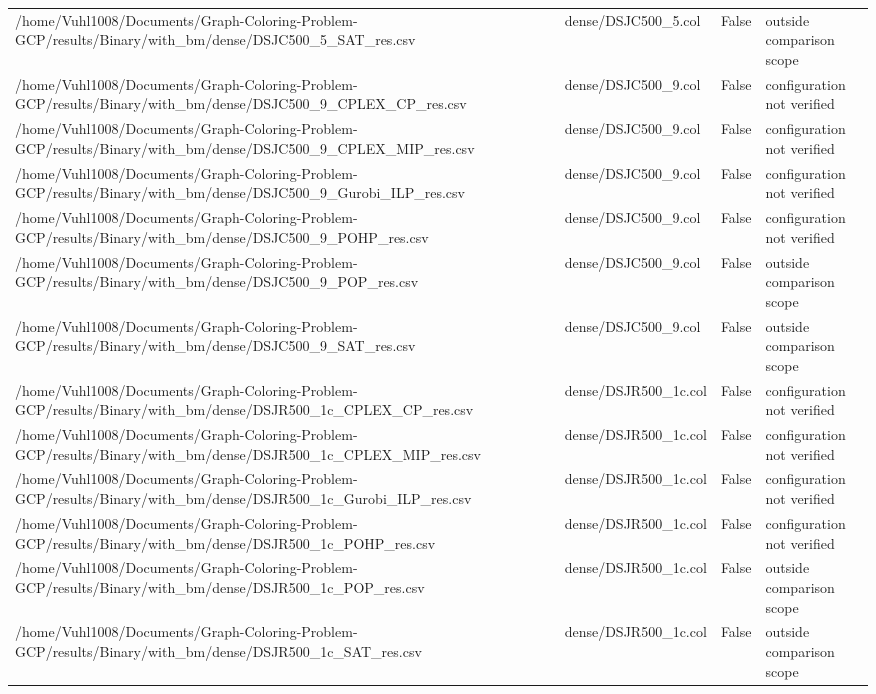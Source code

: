 \begin{table}[htbp]
\begin{tabular}{llll}
/home/Vuhl1008/Documents/Graph-Coloring-Problem-GCP/results/Binary/with\_bm/dense/DSJC500\_5\_SAT\_res.csv & dense/DSJC500\_5.col & False & outside comparison scope \\
/home/Vuhl1008/Documents/Graph-Coloring-Problem-GCP/results/Binary/with\_bm/dense/DSJC500\_9\_CPLEX\_CP\_res.csv & dense/DSJC500\_9.col & False & configuration not verified \\
/home/Vuhl1008/Documents/Graph-Coloring-Problem-GCP/results/Binary/with\_bm/dense/DSJC500\_9\_CPLEX\_MIP\_res.csv & dense/DSJC500\_9.col & False & configuration not verified \\
/home/Vuhl1008/Documents/Graph-Coloring-Problem-GCP/results/Binary/with\_bm/dense/DSJC500\_9\_Gurobi\_ILP\_res.csv & dense/DSJC500\_9.col & False & configuration not verified \\
/home/Vuhl1008/Documents/Graph-Coloring-Problem-GCP/results/Binary/with\_bm/dense/DSJC500\_9\_POHP\_res.csv & dense/DSJC500\_9.col & False & configuration not verified \\
/home/Vuhl1008/Documents/Graph-Coloring-Problem-GCP/results/Binary/with\_bm/dense/DSJC500\_9\_POP\_res.csv & dense/DSJC500\_9.col & False & outside comparison scope \\
/home/Vuhl1008/Documents/Graph-Coloring-Problem-GCP/results/Binary/with\_bm/dense/DSJC500\_9\_SAT\_res.csv & dense/DSJC500\_9.col & False & outside comparison scope \\
/home/Vuhl1008/Documents/Graph-Coloring-Problem-GCP/results/Binary/with\_bm/dense/DSJR500\_1c\_CPLEX\_CP\_res.csv & dense/DSJR500\_1c.col & False & configuration not verified \\
/home/Vuhl1008/Documents/Graph-Coloring-Problem-GCP/results/Binary/with\_bm/dense/DSJR500\_1c\_CPLEX\_MIP\_res.csv & dense/DSJR500\_1c.col & False & configuration not verified \\
/home/Vuhl1008/Documents/Graph-Coloring-Problem-GCP/results/Binary/with\_bm/dense/DSJR500\_1c\_Gurobi\_ILP\_res.csv & dense/DSJR500\_1c.col & False & configuration not verified \\
/home/Vuhl1008/Documents/Graph-Coloring-Problem-GCP/results/Binary/with\_bm/dense/DSJR500\_1c\_POHP\_res.csv & dense/DSJR500\_1c.col & False & configuration not verified \\
/home/Vuhl1008/Documents/Graph-Coloring-Problem-GCP/results/Binary/with\_bm/dense/DSJR500\_1c\_POP\_res.csv & dense/DSJR500\_1c.col & False & outside comparison scope \\
/home/Vuhl1008/Documents/Graph-Coloring-Problem-GCP/results/Binary/with\_bm/dense/DSJR500\_1c\_SAT\_res.csv & dense/DSJR500\_1c.col & False & outside comparison scope \\

\end{tabular}
\end{table}
